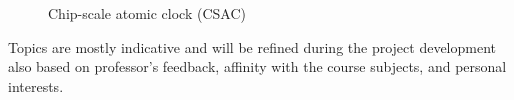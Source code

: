\begin{figure}[H]
\begin{minipage}[b]{0.30\textwidth}
        \caption{Chip-scale atomic clock (CSAC) \cite{8956703}}
    \end{minipage}
\end{figure}

Topics are mostly indicative and will be refined during the project development also based on professor's feedback, affinity with the course subjects, and personal interests.
